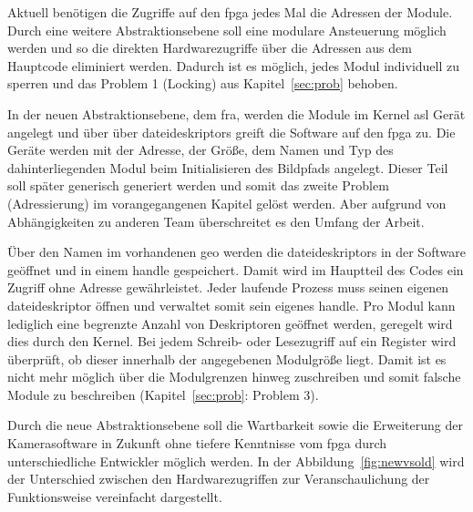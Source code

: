 Aktuell benötigen die Zugriffe auf den \ac{fpga} jedes Mal die Adressen der Module. Durch eine weitere Abstraktionsebene soll eine modulare Ansteuerung möglich werden und so die direkten Hardwarezugriffe über die Adressen aus dem Hauptcode eliminiert werden. Dadurch ist es möglich, jedes Modul individuell zu sperren und das Problem 1 (Locking) aus Kapitel~\ref{sec:prob} behoben.


In der neuen Abstraktionsebene, dem \ac{fra}, werden die Module im Kernel asl Gerät angelegt und über über \glspl{dateideskriptor} greift die Software auf den \ac{fpga} zu. Die Geräte werden mit der Adresse, der Größe, dem Namen und Typ des dahinterliegenden Modul beim Initialisieren des Bildpfads angelegt. Dieser Teil soll später generisch generiert werden und somit das zweite Problem (Adressierung) im vorangegangenen Kapitel gelöst werden. Aber aufgrund von Abhängigkeiten zu anderen Team überschreitet es den Umfang der Arbeit.



Über den Namen im vorhandenen \ac{geo} werden die \glspl{dateideskriptor} in der Software geöffnet und in einem \gls{handle} gespeichert. Damit wird im Hauptteil des Codes ein Zugriff ohne Adresse gewährleistet. Jeder laufende Prozess muss seinen eigenen \gls{dateideskriptor} öffnen und verwaltet somit sein eigenes \gls{handle}. Pro Modul kann lediglich eine begrenzte Anzahl von Deskriptoren geöffnet werden, geregelt wird dies durch den Kernel. 
Bei jedem Schreib- oder Lesezugriff auf ein Register wird überprüft, ob dieser innerhalb der angegebenen Modulgröße liegt. Damit ist es nicht mehr möglich über die Modulgrenzen hinweg zuschreiben und somit falsche Module zu beschreiben (Kapitel~\ref{sec:prob}: Problem 3).



Durch die neue Abstraktionsebene soll die Wartbarkeit sowie die Erweiterung der Kamerasoftware in Zukunft ohne tiefere Kenntnisse vom \ac{fpga} durch unterschiedliche Entwickler möglich werden. In der Abbildung~\ref{fig:newvsold} wird der Unterschied zwischen den Hardwarezugriffen zur Veranschaulichung der Funktionsweise vereinfacht dargestellt.




